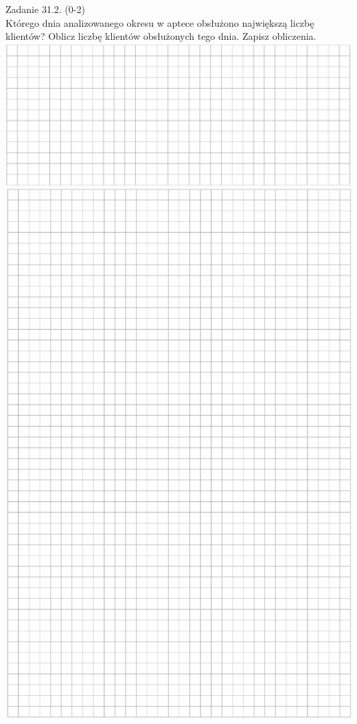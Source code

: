 \documentclass[10pt]{article}
\begin{document}
Zadanie 31.2. (0-2)\\
Którego dnia analizowanego okresu w aptece obsłużono największą liczbę klientów? Oblicz liczbę klientów obsłużonych tego dnia. Zapisz obliczenia.\\
\includegraphics[max width=\textwidth, center]{2024_11_21_51cb67544fb9b029f01cg-27}\\
\includegraphics[max width=\textwidth, center]{2024_11_21_51cb67544fb9b029f01cg-28}
\end{document}
